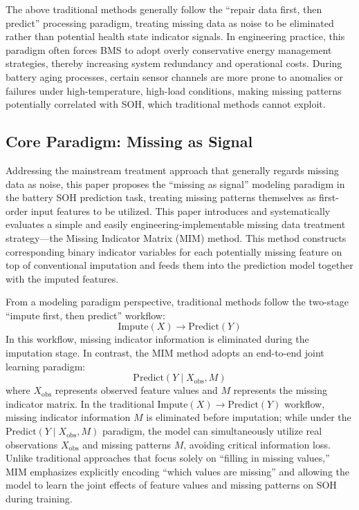 \documentclass[5p,times]{elsarticle}
\begin{document}
The above traditional methods generally follow the ``repair data first, then predict'' processing paradigm, treating missing data as noise to be eliminated rather than potential health state indicator signals. In engineering practice, this paradigm often forces BMS to adopt overly conservative energy management strategies, thereby increasing system redundancy and operational costs. During battery aging processes, certain sensor channels are more prone to anomalies or failures under high-temperature, high-load conditions, making missing patterns potentially correlated with SOH, which traditional methods cannot exploit.

\subsection{Core Paradigm: Missing as Signal}

Addressing the mainstream treatment approach that generally regards missing data as noise, this paper proposes the ``missing as signal'' modeling paradigm in the battery SOH prediction task, treating missing patterns themselves as first-order input features to be utilized. This paper introduces and systematically evaluates a simple and easily engineering-implementable missing data treatment strategy---the Missing Indicator Matrix (MIM) method\cite{jones1996indicator,van2023missing}. This method constructs corresponding binary indicator variables for each potentially missing feature on top of conventional imputation and feeds them into the prediction model together with the imputed features.

From a modeling paradigm perspective, traditional methods follow the two-stage ``impute first, then predict'' workflow:
\begin{equation}
    \text{Impute}(X) \rightarrow \text{Predict}(Y)
\end{equation}
In this workflow, missing indicator information is eliminated during the imputation stage. In contrast, the MIM method adopts an end-to-end joint learning paradigm:
\begin{equation}
    \text{Predict}(Y \mid X_{\mathrm{obs}}, M)
\end{equation}
where $X_{\mathrm{obs}}$ represents observed feature values and $M$ represents the missing indicator matrix. In the traditional $\text{Impute}(X)\rightarrow\text{Predict}(Y)$ workflow, missing indicator information $M$ is eliminated before imputation; while under the $\text{Predict}(Y \mid X_{\mathrm{obs}}, M)$ paradigm, the model can simultaneously utilize real observations $X_{\mathrm{obs}}$ and missing patterns $M$, avoiding critical information loss. Unlike traditional approaches that focus solely on ``filling in missing values,'' MIM emphasizes explicitly encoding ``which values are missing'' and allowing the model to learn the joint effects of feature values and missing patterns on SOH during training.
\end{document}
